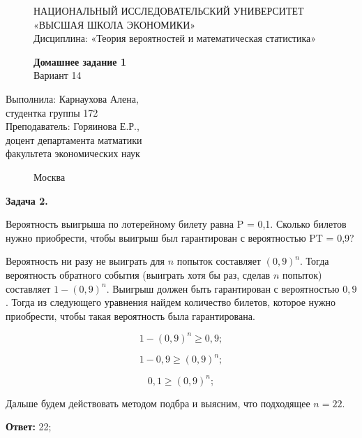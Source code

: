 \documentclass[]{article}
\begin{document}
	\begin{figure}[t]
		\centering
		\large
		НАЦИОНАЛЬНЫЙ ИССЛЕДОВАТЕЛЬСКИЙ УНИВЕРСИТЕТ\\
		«ВЫСШАЯ ШКОЛА ЭКОНОМИКИ»\\
		Дисциплина: «Теория вероятностей и математическая статистика»
	\end{figure}
	
	\begin{figure}[h]
	\vspace{3in}
	\centering
	\Huge
	\textbf{Домашнее задание 1}\\
	Вариант 14 
	\end{figure}
	
	\vspace{2in}
	\Large
	\raggedleft
	Выполнила: Карнаухова Алена,\\
	студентка группы 172\\
	\vspace{12pt}
	Преподаватель: Горяинова Е.Р.,\\
	доцент департамента матматики\\
	факультета экономических наук
	
	\begin{figure}[b]
		\centering
		Москва \the\year
	\end{figure}
	
	\thispagestyle{empty}
	
	\newpage
	
	\centering
	\textbf{Задача 2.}
	
	\vspace{10pt}
	
	\raggedright
	\large
	
	Вероятность выигрыша по лотерейному билету равна P = 0,1. Сколько билетов нужно приобрести, чтобы выигрыш был гарантирован с вероятностью PT = 0,9?
	
	\vspace{20pt}
	
	Вероятность ни разу не выиграть для $n$ попыток составляет $(0,9)^n$. Тогда вероятность обратного события (выиграть хотя бы раз, сделав $n$ попыток) составляет $1 - (0,9)^n$. Выигрыш должен быть гарантирован с вероятностью $0,9$. Тогда из следующего уравнения найдем количество билетов, которое нужно приобрести, чтобы такая вероятность была гарантирована.
	
	\vspace{10pt}
	
	\begin{equation}
	1 - (0,9)^n \geq 0,9;
	\end{equation}
	
	\begin{equation}
	1 - 0,9 \geq (0,9)^n;
	\end{equation}
	
	\begin{equation}
	0,1 \geq (0,9)^n;
	\end{equation}
	
	\vspace{10pt}
	Дальше будем действовать методом подбра и выясним, что подходящее $n = 22.$
	
	\vspace{10pt}
	
	\textbf{Ответ:} 22;
	
	
\end{document}
